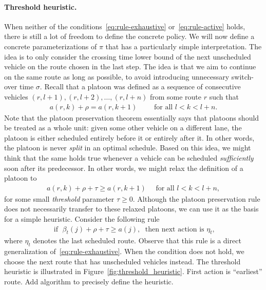\documentclass[a4paper]{report}
\theoremstyle{definition}
\theoremstyle{plain}
\newcommand\note[1]{{\color{Navy}\noindent#1}}
\begin{document}
\paragraph{Threshold heuristic.}
When neither of the conditions~\eqref{eq:rule-exhaustive}
or~\eqref{eq:rule-active} holds, there is still a lot of freedom to define the
concrete policy.
%
We will now define a concrete parameterizations of $\pi$ that has a particularly
simple interpretation.
%
The idea is to only consider the crossing time lower bound of the next
unscheduled vehicle on the route chosen in the last step. The idea is that we
aim to continue on the same route as long as possible, to avoid introducing
unnecessary switch-over time $\sigma$.
%
Recall that a platoon was defined as a sequence of consecutive vehicles
$(r, l+1), (r, l+2), \dots, (r, l+n)$ from some route $r$ such that
\begin{align*}
  a(r,k) + \rho = a(r, k+1)  \quad \quad \text{ for all } l < k < l + n.
\end{align*}
%
Note that the platoon preservation theorem essentially says that platoons should
be treated as a whole unit: given some other vehicle on a different lane, the
platoon is either scheduled entirely before it or entirely after it. In other
words, the platoon is never \emph{split} in an optimal schedule.
Based on this idea, we might think that the same holds true whenever a vehicle
can be scheduled \textit{sufficiently} soon after its predecessor.
%
In other words, we might relax the definition of a platoon to
\begin{align}
  a(r,k) + \rho + \tau \geq a(r, k + 1) \quad \text{ for all } l < k < l + n,
\end{align}
for some small \emph{threshold} parameter $\tau \geq 0$.
%
Although the platoon preservation rule does not necessarily transfer to these
relaxed platoons, we can use it as the basis for a simple heuristic.
%
Consider the following rule
\begin{align}
  \text{ if } \; \beta_t(j) + \rho + \tau \geq a(j) , \; \text{ then next action is } \eta_t ,
\end{align}
where $\eta_t$ denotes the last scheduled route. Observe that this rule is a
direct generalization of~\eqref{eq:rule-exhaustive}.
%
When the condition does not hold, we choose the next route that has unscheduled
vehicles instead. The threshold heuristic is illustrated in
Figure~\ref{fig:threshold_heuristic}. \note{First action is ``earliest'' route.
  Add algorithm to precisely define the heuristic.}
\end{document}
